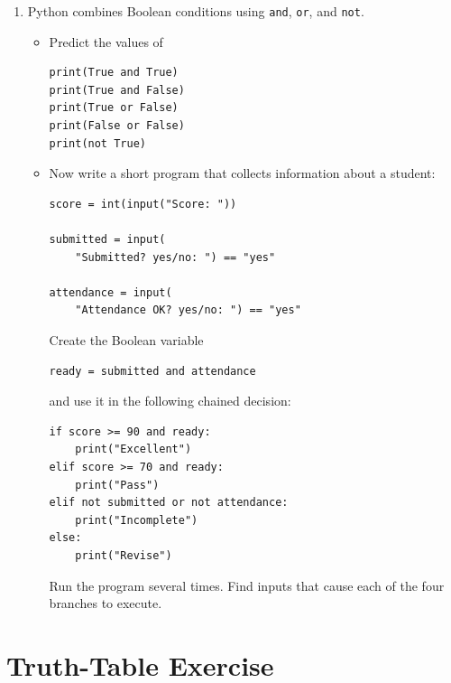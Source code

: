 \documentclass{article}
\begin{document}
\begin{enumerate}

\item Python combines Boolean conditions using
\texttt{and}, \texttt{or}, and \texttt{not}.

\begin{itemize}

\item Predict the values of

\begin{verbatim}
print(True and True)
print(True and False)
print(True or False)
print(False or False)
print(not True)
\end{verbatim}

\item Now write a short program that collects information
about a student:

\begin{verbatim}
score = int(input("Score: "))

submitted = input(
    "Submitted? yes/no: ") == "yes"

attendance = input(
    "Attendance OK? yes/no: ") == "yes"
\end{verbatim}

Create the Boolean variable

\begin{verbatim}
ready = submitted and attendance
\end{verbatim}

and use it in the following chained decision:

\begin{verbatim}
if score >= 90 and ready:
    print("Excellent")
elif score >= 70 and ready:
    print("Pass")
elif not submitted or not attendance:
    print("Incomplete")
else:
    print("Revise")
\end{verbatim}

Run the program several times.  Find inputs that cause
each of the four branches to execute.

\end{itemize}
\end{enumerate}

\section{Truth-Table Exercise}
\end{document}
